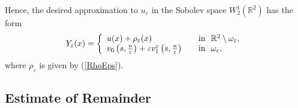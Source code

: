 \documentclass[graybox]{svmult}
\newcommand{\Real}{\mathbb R}
\newcommand{\eps}{\varepsilon}
\newcommand\nep{\textstyle\frac n\eps}
\newcommand{\eqref}[1]{(\ref{#1})}
\begin{document}
Hence, the desired approximation to $u_\eps$ in the Sobolev space $W_2^1(\Real^2)$ has the form
\begin{equation}\label{AsymptoticsUe}
Y_\eps(x)=
\left\{
  \begin{array}{ll}
    u(x)+\rho_\eps(x)&\quad \hbox{in \ }\Real^2\setminus \omega_\eps, \\
    v_0\left(s,\nep\right)+\eps v_1^\eps\left(s,\nep\right)
&\quad \hbox{in \ } \omega_\eps,
  \end{array}
\right.
\end{equation}
where $\rho_\eps$ is given by \eqref{RhoEps}.







\subsection{Estimate of Remainder}
\end{document}
